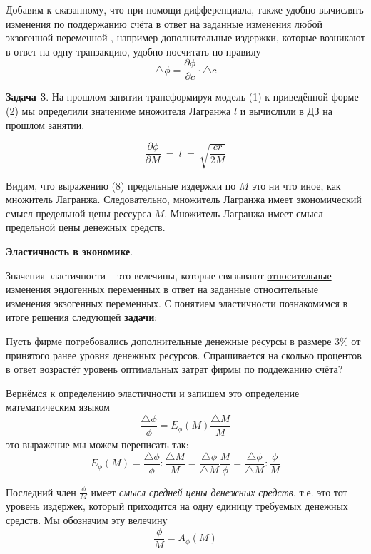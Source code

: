 \documentclass[12pt,a4paper]{article}
\begin{document}
Добавим к сказанному, что при помощи дифференциала, также удобно вычислять изменения по поддержанию счёта в ответ на заданные изменения любой экзогенной переменной , например дополнительные издержки, которые возникают в ответ на одну транзакцию, удобно посчитать по правилу 
\begin{equation}
\triangle \phi = \frac{\partial \phi}{\partial c} \cdot \triangle c
\end{equation}

\textbf{Задача 3}. На прошлом занятии трансформируя модель (1) к приведённой форме (2) мы определили значениме множителя Лагранжа $l$ и вычислили в ДЗ на прошлом занятии.

\begin{equation}
\frac{\partial \phi }{\partial M} \ =\ l\ =\ \sqrt{\frac{cr}{2M}}
\end{equation}

Видим, что выражению (8) предельные издержки по $M$ это ни что иное, как множитель Лагранжа. Следовательно, множитель Лагранжа имеет экономический смысл предельной цены рессурса $M$. Множитель Лагранжа имеет смысл предельной цены денежных средств.

\begin{center}
 \textbf{Эластичность в экономике}.
 \end{center} 

Значения эластичности -- это велечины, которые связывают \underline{относительные} изменения эндогенных переменных в ответ на заданные относительные изменения экзогенных переменных. С понятием эластичности познакомимся в итоге решения следующей \textbf{задачи}:

Пусть фирме потребовались дополнительные денежные ресурсы в размере 3\% от принятого ранее уровня денежных ресурсов. Спрашивается на сколько процентов в ответ возрастёт уровень оптимальных затрат фирмы по поддежанию счёта?

Вернёмся к определению эластичности и запишем это определение математическим языком 
\begin{equation}
\frac{\triangle \phi}{\phi} = E_\phi(M) \frac{\triangle M}{M}
\end{equation}
это выражение мы можем переписать так:
\begin{equation}
E_\phi(M) = \frac{\triangle \phi}{\phi} : \frac{\triangle M}{M} = \frac{\triangle \phi}{\triangle M} \frac{M}{\phi} = \frac{\triangle \phi}{\triangle M} : \frac{\phi}{M}
\end{equation}

Последний член $\displaystyle{\frac{\phi}{M}}$ имеет \textit{смысл средней цены денежных средств}, т.е. это тот уровень издержек, который приходится на одну единицу требуемых денежных средств. Мы обозначим эту велечину
\begin{equation}
\frac{\phi}{M} = A_{\phi} (M)
\end{equation}
\end{document}
